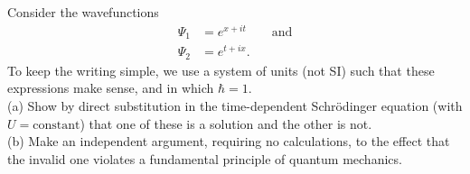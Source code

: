 Consider the wavefunctions
\begin{align*}
  \Psi_1 &= e^{x+it} \qquad \text{and} \\
  \Psi_2 &= e^{t+ix}.
\end{align*}
To keep the writing simple, we use a system of units (not SI) such that these expressions make
sense, and in which $\hbar=1$.\\
(a) Show by direct substitution in the time-dependent Schr\"odinger equation (with $U=\text{constant}$)
that one of these
is a solution and the other is not.\\
(b) Make an independent argument, requiring no calculations, to the effect that the invalid
one violates a fundamental principle of quantum mechanics.
